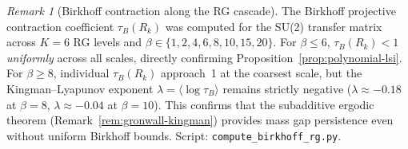 \documentclass[12pt,a4paper]{article}
\theoremstyle{definition}
\theoremstyle{plain}
\theoremstyle{remark}
\newtheorem{remark}[definition]{Remark}
\begin{document}
\begin{remark}[Birkhoff contraction along the RG cascade]
\label{rem:birkhoff-numerics}
The Birkhoff projective contraction coefficient $\tau_B(R_k)$ was computed for the SU(2) transfer matrix across $K=6$ RG levels and $\beta \in \{1, 2, 4, 6, 8, 10, 15, 20\}$. For $\beta \leq 6$, $\tau_B(R_k) < 1$ \emph{uniformly} across all scales, directly confirming Proposition~\ref{prop:polynomial-lsi}. For $\beta \geq 8$, individual $\tau_B(R_k)$ approach~1 at the coarsest scale, but the Kingman--Lyapunov exponent $\lambda = \langle \log \tau_B \rangle$ remains strictly negative ($\lambda \approx -0.18$ at $\beta=8$, $\lambda \approx -0.04$ at $\beta=10$). This confirms that the subadditive ergodic theorem (Remark~\ref{rem:gronwall-kingman}) provides mass gap persistence even without uniform Birkhoff bounds. Script: \texttt{compute\_birkhoff\_rg.py}.
\end{remark}

\end{document}

